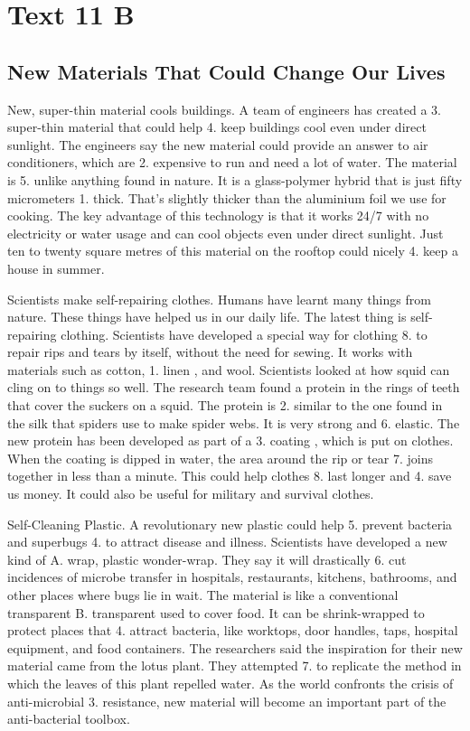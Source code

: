 \section{Text 11 B}
\subsection*{New Materials That Could Change Our Lives}

 New, super-thin material cools buildings. A team of engineers has created a 3. super-thin material that could help 4. keep buildings cool even under direct sunlight. The engineers say the new material could provide an answer to air conditioners, which are 2. expensive to run and need a lot of water. The material is 5. unlike anything found in nature. It is a glass-polymer hybrid that is just fifty micrometers 1. thick. That's slightly thicker than the aluminium foil we use for cooking. The key advantage of this technology is that it works 24/7 with no electricity or water usage and can cool objects even under direct sunlight. Just ten to twenty square metres of this material on the rooftop could nicely 4. keep a house in summer.

 Scientists make self-repairing clothes. Humans have learnt many things from nature. These things have helped us in our daily life. The latest thing is self-repairing clothing. Scientists have developed a special way for clothing 8. to repair rips and tears by itself, without the need for sewing. It works with materials such as cotton, 1. linen , and wool. Scientists looked at how squid can cling on to things so well. The research team found a protein in the rings of teeth that cover the suckers on a squid. The protein is 2. similar to the one found in the silk that spiders use to make spider webs. It is very strong and 6. elastic. The new protein has been developed as part of a 3. coating , which is put on clothes. When the coating is dipped in water, the area around the rip or tear 7. joins together in less than a minute. This could help clothes 8. last longer and 4. save us money. It could also be useful for military and survival clothes.

 Self-Cleaning Plastic. A revolutionary new plastic could help 5. prevent bacteria and superbugs 4. to attract disease and illness. Scientists have developed a new kind of A. wrap, plastic wonder-wrap. They say it will drastically 6. cut incidences of microbe transfer in hospitals, restaurants, kitchens, bathrooms, and other places where bugs lie in wait. The material is like a conventional transparent B. transparent used to cover food. It can be shrink-wrapped to protect places that 4. attract bacteria, like worktops, door handles, taps, hospital equipment, and food containers. The researchers said the inspiration for their new material came from the lotus plant. They attempted 7. to replicate the method in which the leaves of this plant repelled water. As the world confronts the crisis of anti-microbial 3. resistance, new material will become an important part of the anti-bacterial toolbox.

